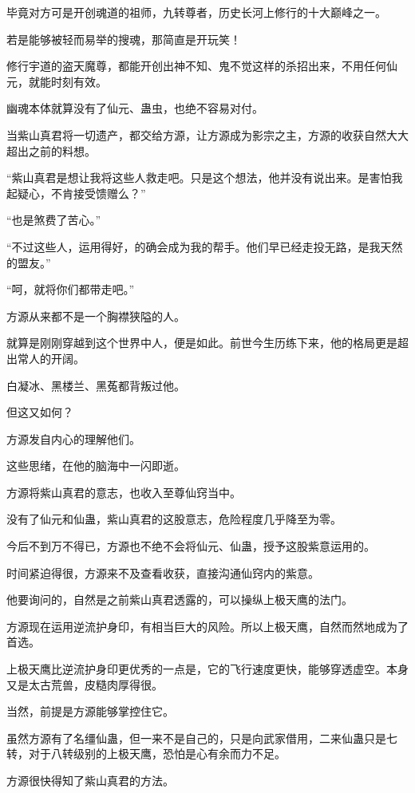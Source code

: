 
\begin{this_body}

毕竟对方可是开创魂道的祖师，九转尊者，历史长河上修行的十大巅峰之一。

若是能够被轻而易举的搜魂，那简直是开玩笑！

修行宇道的盗天魔尊，都能开创出神不知、鬼不觉这样的杀招出来，不用任何仙元，就能时刻有效。

幽魂本体就算没有了仙元、蛊虫，也绝不容易对付。

当紫山真君将一切遗产，都交给方源，让方源成为影宗之主，方源的收获自然大大超出之前的料想。

“紫山真君是想让我将这些人救走吧。只是这个想法，他并没有说出来。是害怕我起疑心，不肯接受馈赠么？”

“也是煞费了苦心。”

“不过这些人，运用得好，的确会成为我的帮手。他们早已经走投无路，是我天然的盟友。”

“呵，就将你们都带走吧。”

方源从来都不是一个胸襟狭隘的人。

就算是刚刚穿越到这个世界中人，便是如此。前世今生历练下来，他的格局更是超出常人的开阔。

白凝冰、黑楼兰、黑菟都背叛过他。

但这又如何？

方源发自内心的理解他们。

这些思绪，在他的脑海中一闪即逝。

方源将紫山真君的意志，也收入至尊仙窍当中。

没有了仙元和仙蛊，紫山真君的这股意志，危险程度几乎降至为零。

今后不到万不得已，方源也不绝不会将仙元、仙蛊，授予这股紫意运用的。

时间紧迫得很，方源来不及查看收获，直接沟通仙窍内的紫意。

他要询问的，自然是之前紫山真君透露的，可以操纵上极天鹰的法门。

方源现在运用逆流护身印，有相当巨大的风险。所以上极天鹰，自然而然地成为了首选。

上极天鹰比逆流护身印更优秀的一点是，它的飞行速度更快，能够穿透虚空。本身又是太古荒兽，皮糙肉厚得很。

当然，前提是方源能够掌控住它。

虽然方源有了名缰仙蛊，但一来不是自己的，只是向武家借用，二来仙蛊只是七转，对于八转级别的上极天鹰，恐怕是心有余而力不足。

方源很快得知了紫山真君的方法。


\end{this_body}
